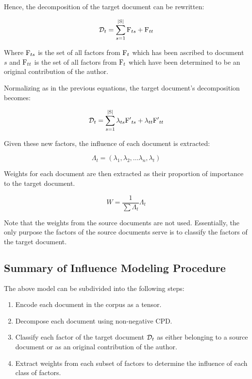 \documentclass[../dissertation.tex]{subfiles}
\begin{document}
Hence, the decomposition of the target document can be rewritten:

\begin{equation} \label{eq:influence_factors}
  \mathcal{D}_t = \sum_{s=1}^{|\mathrm{S}|} \mathrm{F}_{ts} + \mathrm{F}_{tt}
\end{equation}

Where $\mathrm{F}_{ts}$  is the set of all factors from $\mathrm{F}_t$ which
has been ascribed to document $s$ and $\mathrm{F}_{tt}$ is the set of all
factors from $\mathrm{F}_t$ which have been determined to be an original
contribution of the author.

Normalizing as in the previous equations, the target
document's decomposition becomes:

\begin{equation} \label{eq:influence_factors_normalized}
  \mathcal{D}_t = \sum_{s=1}^{|\mathrm{S}|} \lambda_{ts} \mathrm{F'}_{ts} +
  \lambda_{tt} \mathrm{F'}_{tt}
\end{equation}

Given these new factors, the influence of each document is extracted:

\begin{equation} \label{eq:document_lambda}
  \Lambda_t = (\lambda_1, \lambda_2, \ldots \lambda_n, \lambda_t)
\end{equation}

Weights for each document are then extracted as their proportion of
importance to the target document.

\begin{equation} \label{eq:document_weights}
  W = \dfrac{1}{\sum \Lambda_t} \Lambda_t
\end{equation}

Note that the weights from the source documents are not used.
Essentially, the only purpose the factors of the source documents
serve is to classify the factors of the target document.

\subsection{Summary of Influence Modeling Procedure}
The above model can be subdivided into the following steps:

\begin{enumerate}
\item Encode each document in the corpus as a tensor.
\item Decompose each document using non-negative CPD.
\item Classify each factor of the target document $\mathcal{D}_t$ as
  either belonging to a source document or as an original contribution
  of the author.
\item Extract weights from each subset of factors to determine the
  influence of each class of factors.
\end{enumerate}
\end{document}
